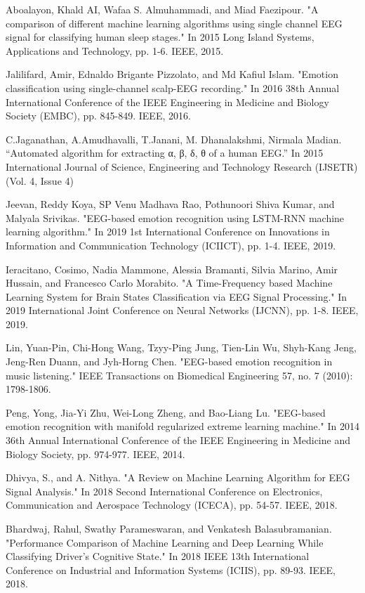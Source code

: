 \documentclass[conference]{IEEEtran}
\begin{document}
\begin{thebibliography}{00}
 Aboalayon, Khald AI, Wafaa S. Almuhammadi, and Miad Faezipour. "A comparison of different machine learning algorithms using single channel EEG signal for classifying human sleep stages." In 2015 Long Island Systems, Applications and Technology, pp. 1-6. IEEE, 2015.

 Jalilifard, Amir, Ednaldo Brigante Pizzolato, and Md Kafiul Islam. "Emotion classification using single-channel scalp-EEG recording." In 2016 38th Annual International Conference of the IEEE Engineering in Medicine and Biology Society (EMBC), pp. 845-849. IEEE, 2016.

 C.Jaganathan, A.Amudhavalli, T.Janani, M. Dhanalakshmi, Nirmala Madian. “Automated algorithm for extracting α, β, δ, θ of a human EEG.” In 2015 International Journal of Science, Engineering and Technology Research (IJSETR) (Vol. 4, Issue 4)

 Jeevan, Reddy Koya, SP Venu Madhava Rao, Pothunoori Shiva Kumar, and Malyala Srivikas. "EEG-based emotion recognition using LSTM-RNN machine learning algorithm." In 2019 1st International Conference on Innovations in Information and Communication Technology (ICIICT), pp. 1-4. IEEE, 2019.

 Ieracitano, Cosimo, Nadia Mammone, Alessia Bramanti, Silvia Marino, Amir Hussain, and Francesco Carlo Morabito. "A Time-Frequency based Machine Learning System for Brain States Classification via EEG Signal Processing." In 2019 International Joint Conference on Neural Networks (IJCNN), pp. 1-8. IEEE, 2019.

 Lin, Yuan-Pin, Chi-Hong Wang, Tzyy-Ping Jung, Tien-Lin Wu, Shyh-Kang Jeng, Jeng-Ren Duann, and Jyh-Horng Chen. "EEG-based emotion recognition in music listening." IEEE Transactions on Biomedical Engineering 57, no. 7 (2010): 1798-1806.

 Peng, Yong, Jia-Yi Zhu, Wei-Long Zheng, and Bao-Liang Lu. "EEG-based emotion recognition with manifold regularized extreme learning machine." In 2014 36th Annual International Conference of the IEEE Engineering in Medicine and Biology Society, pp. 974-977. IEEE, 2014. 

 Dhivya, S., and A. Nithya. "A Review on Machine Learning Algorithm for EEG Signal Analysis." In 2018 Second International Conference on Electronics, Communication and Aerospace Technology (ICECA), pp. 54-57. IEEE, 2018.

 Bhardwaj, Rahul, Swathy Parameswaran, and Venkatesh Balasubramanian. "Performance Comparison of Machine Learning and Deep Learning While Classifying Driver’s Cognitive State." In 2018 IEEE 13th International Conference on Industrial and Information Systems (ICIIS), pp. 89-93. IEEE, 2018.


\end{thebibliography}
\end{document}
